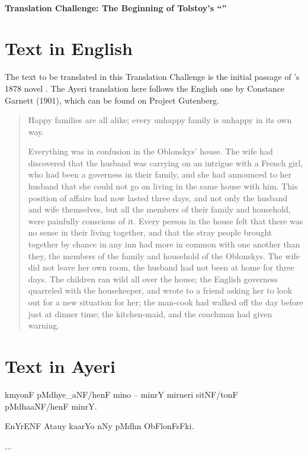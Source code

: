 \documentclass[12pt,paper=letter]{scrartcl}
\newcommand{\q}[1]{\enquote{#1}} %
\newenvironment{ayeri}{\begin{multicols}{2} \Tagati}{\end{multicols} \par}
\newenvironment{mytitle}{\begin{center} \Large \sffamily\bfseries ~\\}{\end{center}}
\begin{document}

\begin{mytitle}
    Translation Challenge: The Beginning of Tolstoy's \q{}
\end{mytitle}

\section{Text in English}

The text to be translated in this Translation Challenge is the initial passage
of \citeauthor{tolstoy}'s 1878 novel . The Ayeri translation 
here follows the English one by Constance Garnett (1901), which can be
found on Project Gutenberg.

\blockcquote{tolstoy}{
\noindent Happy families are all alike; every unhappy family is unhappy in its 
own way.

Everything was in confusion in the Oblonskys’ house. The wife had discovered 
that the husband was carrying on an intrigue with a French girl, who had been a 
governess in their family, and she had announced to her husband that she could 
not go on living in the same house with him. This position of affairs had now 
lasted three days, and not only the husband and wife themselves, but all the 
members of their family and household, were painfully conscious of it. Every 
person in the house felt that there was no sense in their living together, and 
that the stray people brought together by chance in any inn had more in common 
with one another than they, the members of the family and household of the 
Oblonskys. The wife did not leave her own room, the husband had not been at 
home for three days. The children ran wild all over the house; the English 
governess quarreled with the housekeeper, and wrote to a friend asking her to 
look out for a new situation for her; the man-cook had walked off the day 
before just at dinner time; the kitchen-maid, and the coachman had given warning.
}

\section{Text in Ayeri}
\begin{ayeri}
kmyonF pMdhye\_aNF/henF mino – minrY mirneri sitNF/tonF pMdhaaNF/henF minrY.

EnYrENF Atauy kaarYo nNy pMdhn ObFlonFsFki.

...
\end{ayeri}
\end{document}
